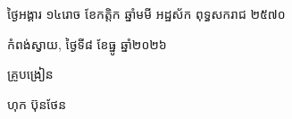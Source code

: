\documentclass[a4paper,10pt]{article}
\begin{document}
\vspace{6pt}
{\centering
\hspace*{5.2cm}\begin{minipage}{11.5cm}
  \centering
  ថ្ងៃអង្គារ ១៤រោច ខែកត្តិក ឆ្នាំមមី អដ្ឋស័ក ពុទ្ធសករាជ ២៥៧០\par
  កំពង់ស្វាយ, ថ្ងៃទី៨ ខែធ្នូ ឆ្នាំ២០២៦\par
  \vspace{2pt}
  {\muol គ្រូបង្រៀន\par}
  \vspace{32pt}
  \hfill{\muol ហុក ប៊ុនថែន}\hspace*{1.4cm}
\end{minipage}\par}
\end{document}
